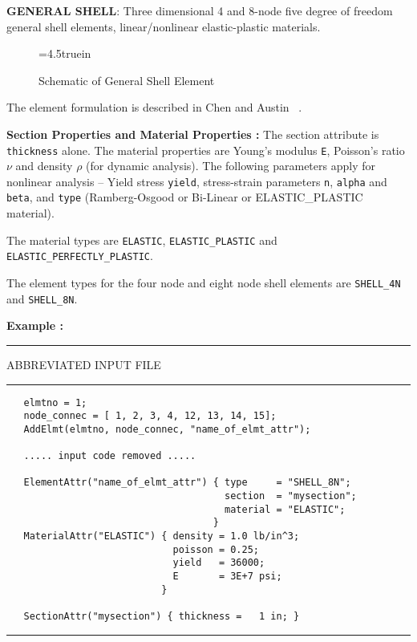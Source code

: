 \clearpage
\vspace{0.15 in}\noindent
{\bf GENERAL SHELL}: Three dimensional 4 and 8-node five degree of
freedom general shell elements, linear/nonlinear elastic-plastic materials.  

\begin{figure} [ht]
\epsfxsize=4.5truein
\centerline{}
\caption{Schematic of General Shell Element}
\label{fig:fe-general-shell}
\end{figure}

\vspace{0.15 in}\noindent
The element formulation is described in Chen and Austin ~\cite{chen95}.

\vspace{0.15 in}\noindent
{\bf Section Properties and Material Properties :} 
The section attribute is {\tt thickness} alone.
The material properties are Young's modulus {\tt E},
Poisson's ratio $\nu$ and density $\rho$ (for dynamic analysis).
The following parameters apply for nonlinear analysis --
Yield stress {\tt yield}, stress-strain parameters {\tt n},
{\tt alpha} and {\tt beta}, and
{\tt type} (Ramberg-Osgood or Bi-Linear or ELASTIC\_PLASTIC material).

\vspace{0.15 in}
\noindent\hspace{0.5 in}
The material types are {\tt ELASTIC},
{\tt ELASTIC\_PLASTIC} and {\tt ELASTIC\_PERFECTLY\_PLASTIC}.

\vspace{0.15 in}
\noindent\hspace{0.5 in}
The element types for the four node and eight node
shell elements are {\tt SHELL\_4N} and {\tt SHELL\_8N}.

\vspace{0.15 in}\noindent
{\bf Example :} 

\vspace{0.10 in}
\begin{footnotesize}
\noindent
{\rule{2.1 in}{0.035 in} ABBREVIATED INPUT FILE \rule{2.1 in}{0.035 in} }
\begin{verbatim}
   elmtno = 1;
   node_connec = [ 1, 2, 3, 4, 12, 13, 14, 15];
   AddElmt(elmtno, node_connec, "name_of_elmt_attr");

   ..... input code removed .....

   ElementAttr("name_of_elmt_attr") { type     = "SHELL_8N";
                                      section  = "mysection";
                                      material = "ELASTIC";
                                    }
   MaterialAttr("ELASTIC") { density = 1.0 lb/in^3; 
                             poisson = 0.25;   
                             yield   = 36000;  
                             E       = 3E+7 psi;
                           }

   SectionAttr("mysection") { thickness =   1 in; }
\end{verbatim}
\rule{6.25 in}{0.035 in}
\end{footnotesize}


